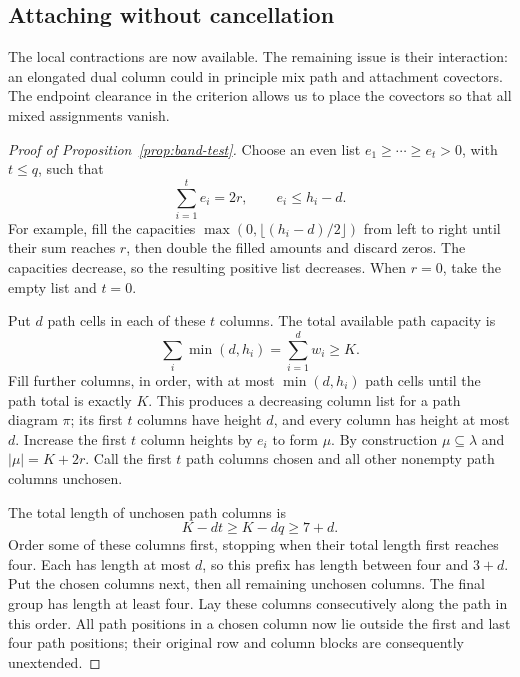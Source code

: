 \subsection{Attaching without cancellation}

The local contractions are now available. The remaining issue is their
interaction: an elongated dual column could in principle mix path and
attachment covectors. The endpoint clearance in the criterion allows us
to place the covectors so that all mixed assignments vanish.

\begin{proof}[Proof of Proposition~\ref{prop:band-test}]
Choose an even list $e_1\ge\cdots\ge e_t>0$, with $t\le q$,
such that
\begin{equation}\label{eq:band-extra-capacities}
 \sum_{i=1}^t e_i=2r,\qquad e_i\le h_i-d.
\end{equation}
For example, fill the capacities
$\max(0,\lfloor(h_i-d)/2\rfloor)$ from left to right until their
sum reaches $r$, then double the filled amounts and discard zeros.
The capacities decrease, so the resulting positive list decreases.
When $r=0$, take the empty list and $t=0$.

Put $d$ path cells in each of these $t$ columns.  The total
available path capacity is
\[
 \sum_i\min(d,h_i)=\sum_{i=1}^d w_i\ge K.
\]
Fill further columns, in order, with at most $\min(d,h_i)$ path
cells until the path total is exactly $K$.  This produces a
decreasing column list for a path diagram $\pi$; its first $t$
columns have height $d$, and every column has height at most $d$.
Increase the first $t$ column heights by $e_i$ to form $\mu$.
By construction $\mu\subseteq\lambda$ and $|\mu|=K+2r$.
Call the first $t$ path columns chosen and all other nonempty
path columns unchosen.

The total length of unchosen path columns is
\[
 K-dt\ge K-dq\ge7+d.
\]
Order some of these columns first, stopping when their total
length first reaches four.  Each has length at most $d$, so
this prefix has length between four and $3+d$.  Put the chosen
columns next, then all remaining unchosen columns.  The final
group has length at least four.  Lay these columns consecutively
along the path in this order.  All path positions in a chosen
column now lie outside the first and last four path positions;
their original row and column blocks are consequently unextended.


\end{proof}
